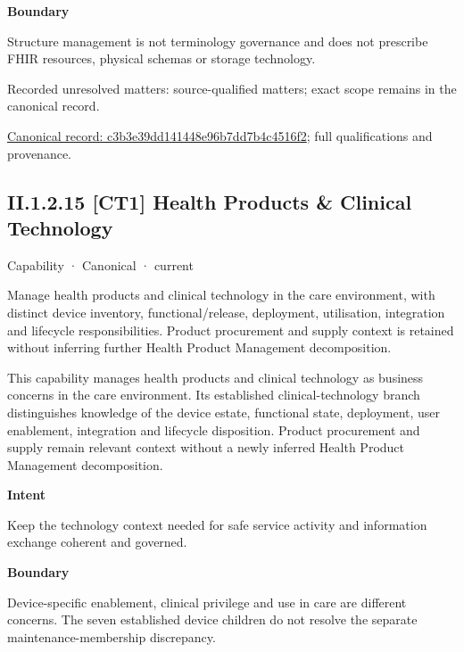 \textbf{Boundary}



Structure management is not terminology governance and does not prescribe FHIR resources, physical schemas or storage technology.


{\small Recorded unresolved matters: source-qualified matters; exact scope remains in the canonical record.}\par
{\footnotesize \href{../../../../continuum/strategy/capability/c3b3e39dd141448e96b7dd7b4c4516f2.md}{Canonical record: c3b3e39dd141448e96b7dd7b4c4516f2}; full qualifications and provenance.}\par
\subsection*{II.1.2.15 [CT1] Health Products \& Clinical Technology}
\label{navigation:II.1.2.15}

\label{element:54388e3202c2403089b5c476c78c4567}
{\small Capability · Canonical · current}\par

Manage health products and clinical technology in the care environment, with distinct device inventory, functional/release, deployment, utilisation, integration and lifecycle responsibilities. Product procurement and supply context is retained without inferring further Health Product Management decomposition.



This capability manages health products and clinical technology as business concerns in the care environment. Its established clinical-technology branch distinguishes knowledge of the device estate, functional state, deployment, user enablement, integration and lifecycle disposition. Product procurement and supply remain relevant context without a newly inferred Health Product Management decomposition.



\textbf{Intent}



Keep the technology context needed for safe service activity and information exchange coherent and governed.



\textbf{Boundary}



Device-specific enablement, clinical privilege and use in care are different concerns. The seven established device children do not resolve the separate maintenance-membership discrepancy.



